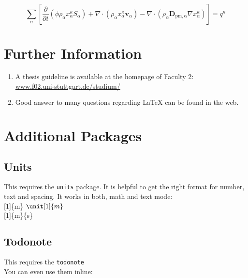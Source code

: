 \begin{equation}\label{eq:massBalance} %
 \sum_{\alpha} \left[\frac{\partial}{\partial t}\left(\phi \rho_\alpha x^\kappa_\alpha S_\alpha \right) 
 + \nabla\cdotp \left(\rho_\alpha x^\kappa_\alpha \mathbf{v}_\alpha \right) 
 - \nabla\cdotp \left(\rho_\alpha \mathbf{D}_\mathrm{pm,\alpha} \nabla x^\kappa_\alpha \right) \right]= q^\kappa
\end{equation}  


\section{Further Information}
\begin{enumerate}
  \item A thesis guideline is available at the homepage of Faculty 2:\\
        \href{http://www.f02.uni-stuttgart.de/studium/}{www.f02.uni-stuttgart.de/studium/}
  \item Good answer to many questions regarding LaTeX can be found in the web.
\end{enumerate}

\section{Additional Packages}
\subsection{Units}
This requires the \texttt{units} package. It is helpful to get the right
format for number, text and spacing. It works in both, math and text mode:\\
[1]\{m\} \hfill $\unit[1]{m}$\\
[1]\{m\}\{s\} \hfill {}\\

\subsection{Todonote}
This requires the \texttt{todonote}
\\
You can even use them inline:


\endinput
